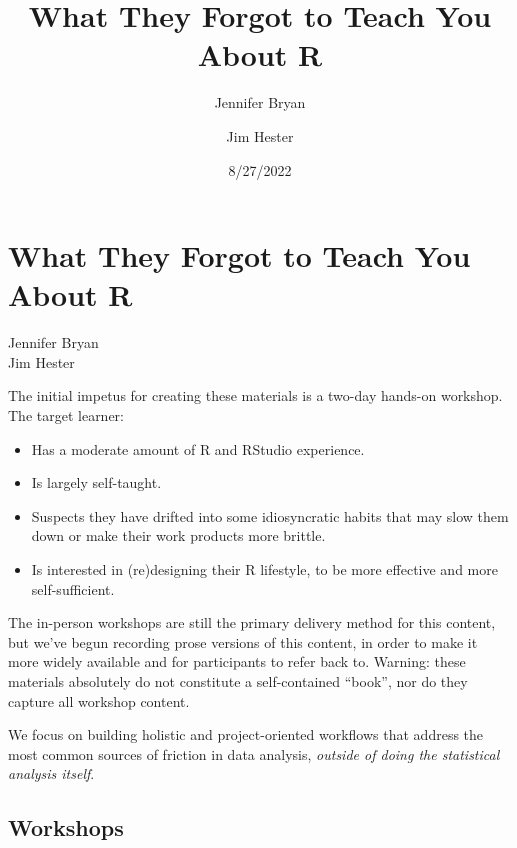 \documentclass[
  letterpaper,
]{book}
\title{What They Forgot to Teach You About R}
\author{Jennifer Bryan \and Jim Hester}
\date{8/27/2022}
\providecommand{\tightlist}{%
  \setlength{\itemsep}{0pt}\setlength{\parskip}{0pt}}\usepackage{longtable,booktabs,array}
\renewcommand*\contentsname{Table of contents}
\newcommand\contentsname{Table of contents}
\begin{document}
\frontmatter
\maketitle
\ifdefined\Shaded\renewenvironment{Shaded}{\begin{tcolorbox}[interior hidden, enhanced, borderline west={3pt}{0pt}{shadecolor}, sharp corners, breakable, boxrule=0pt, frame hidden]}{\end{tcolorbox}}\fi

\renewcommand*\contentsname{Table of contents}
{
\setcounter{tocdepth}{2}
\tableofcontents
}
\mainmatter
{}

\hypertarget{what-they-forgot-to-teach-you-about-r}{%
\chapter{What They Forgot to Teach You About
R}\label{what-they-forgot-to-teach-you-about-r}}

Jennifer Bryan\\
Jim Hester

\hfill\break

The initial impetus for creating these materials is a two-day hands-on
workshop. The target learner:

\begin{itemize}
\tightlist
\item
  Has a moderate amount of R and RStudio experience.
\item
  Is largely self-taught.
\item
  Suspects they have drifted into some idiosyncratic habits that may
  slow them down or make their work products more brittle.
\item
  Is interested in (re)designing their R lifestyle, to be more effective
  and more self-sufficient.
\end{itemize}

The in-person workshops are still the primary delivery method for this
content, but we've begun recording prose versions of this content, in
order to make it more widely available and for participants to refer
back to. Warning: these materials absolutely do not constitute a
self-contained ``book'', nor do they capture all workshop content.

We focus on building holistic and project-oriented workflows that
address the most common sources of friction in data analysis,
\emph{outside of doing the statistical analysis itself}.

\hypertarget{workshops}{%
\section*{Workshops}\label{workshops}}
\end{document}

